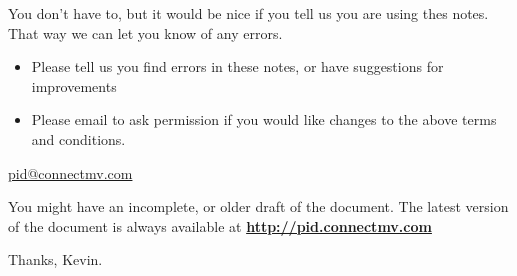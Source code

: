 You don't have to, but it would be nice if you tell us you are using thes notes. That way we can let you know of any errors.
\begin{itemize}
	\item	Please tell us you find errors in these notes, or have suggestions for improvements
	\item	Please email to ask permission if you would like changes to the above terms and conditions.
\end{itemize}

\begin{center}
	{\LARGE \href{mailto:pid@connectmv.com}{pid@connectmv.com}}
\end{center}

You might have an incomplete, or older draft of the document.  The latest version of the document is always available at \textbf{\href{http://pid.connectmv.com}{http://pid.connectmv.com}}

Thanks, Kevin.






